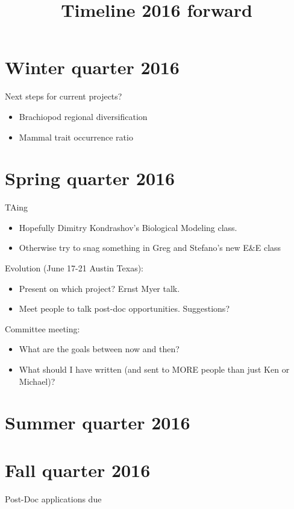 \documentclass{article}
\title{Timeline 2016 forward}
\date{}
\begin{document}
\linenumbers
\modulolinenumbers[2]

\maketitle

\section{Winter quarter 2016}
Next steps for current projects?
\begin{itemize}
  \item Brachiopod regional diversification
  \item Mammal trait occurrence ratio
\end{itemize}


\section{Spring quarter 2016}
TAing
\begin{itemize}
  \item Hopefully Dimitry Kondrashov's Biological Modeling class.
  \item Otherwise try to snag something in Greg and Stefano's new E\&E class
\end{itemize}

Evolution (June 17-21 Austin Texas):
\begin{itemize}
  \item Present on which project? Ernst Myer talk.
  \item Meet people to talk post-doc opportunities. Suggestions?
\end{itemize}

Committee meeting:
\begin{itemize}
  \item What are the goals between now and then?
  \item What should I have written (and sent to MORE people than just Ken or Michael)?
\end{itemize}


\section{Summer quarter 2016}


\section{Fall quarter 2016}
Post-Doc applications due
\end{document}
